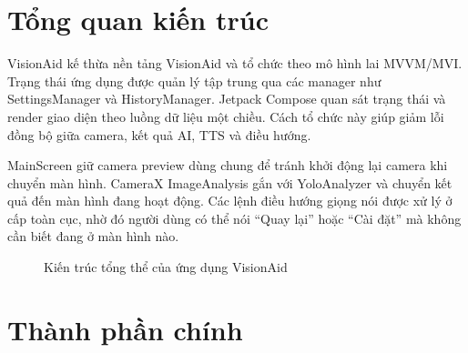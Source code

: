 \documentclass[a4paper,13pt]{report}
\begin{document}
\section{Tổng quan kiến trúc}

VisionAid kế thừa nền tảng VisionAid và tổ chức theo mô hình lai MVVM/MVI. Trạng thái ứng dụng được quản lý tập trung qua các manager như SettingsManager và HistoryManager. Jetpack Compose quan sát trạng thái và render giao diện theo luồng dữ liệu một chiều. Cách tổ chức này giúp giảm lỗi đồng bộ giữa camera, kết quả AI, TTS và điều hướng.

MainScreen giữ camera preview dùng chung để tránh khởi động lại camera khi chuyển màn hình. CameraX ImageAnalysis gắn với YoloAnalyzer và chuyển kết quả đến màn hình đang hoạt động. Các lệnh điều hướng giọng nói được xử lý ở cấp toàn cục, nhờ đó người dùng có thể nói ``Quay lại'' hoặc ``Cài đặt'' mà không cần biết đang ở màn hình nào.

\begin{figure}[H]
    \centering
    \caption{Kiến trúc tổng thể của ứng dụng VisionAid}
\end{figure}

\section{Thành phần chính}
\end{document}
